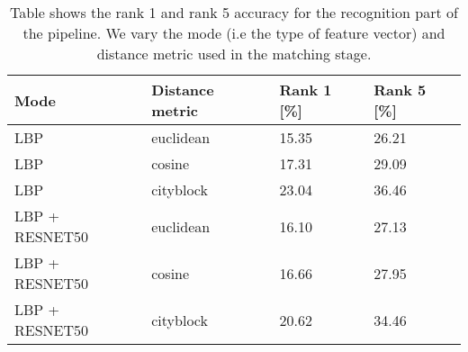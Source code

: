 \begin{table}[h]
    \caption{Table shows the rank 1 and rank 5 accuracy for the recognition part of the pipeline. We vary the mode (i.e the type of feature vector) and distance metric used in the matching stage.}
    \begin{center}
        \begin{tabular}{llll}
            Mode & Distance metric & Rank 1 [\%] & Rank 5 [\%] \\ \hline
            LBP & euclidean & 15.35 & 26.21 \\ 
            LBP & cosine & 17.31 & 29.09 \\ 
            LBP & cityblock & 23.04 & 36.46 \\ 
            LBP + RESNET50 & euclidean & 16.10 & 27.13 \\ 
            LBP + RESNET50 & cosine & 16.66 & 27.95 \\ 
            LBP + RESNET50 & cityblock & 20.62 & 34.46 \\
        \end{tabular}
    \label{tab:recognition_performance}
    \end{center}
\end{table}